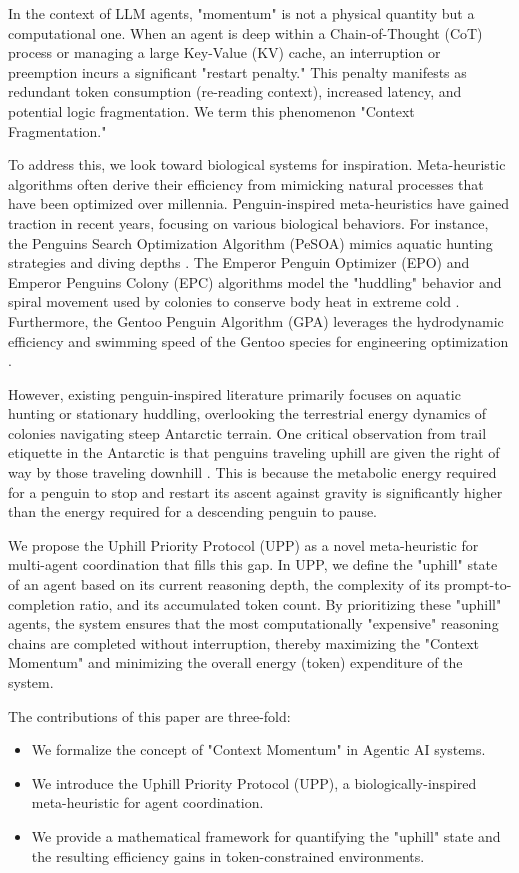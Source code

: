 \documentclass[conference]{IEEEtran}
\begin{document}
In the context of LLM agents, "momentum" is not a physical quantity but a computational one. When an agent is deep within a Chain-of-Thought (CoT) process or managing a large Key-Value (KV) cache, an interruption or preemption incurs a significant "restart penalty." This penalty manifests as redundant token consumption (re-reading context), increased latency, and potential logic fragmentation. We term this phenomenon "Context Fragmentation."

To address this, we look toward biological systems for inspiration. Meta-heuristic algorithms often derive their efficiency from mimicking natural processes that have been optimized over millennia. Penguin-inspired meta-heuristics have gained traction in recent years, focusing on various biological behaviors. For instance, the Penguins Search Optimization Algorithm (PeSOA) mimics aquatic hunting strategies and diving depths \cite{gheraibia2013pesoa}. The Emperor Penguin Optimizer (EPO) and Emperor Penguins Colony (EPC) algorithms model the "huddling" behavior and spiral movement used by colonies to conserve body heat in extreme cold \cite{dhiman2018epo, harifi2019epc}. Furthermore, the Gentoo Penguin Algorithm (GPA) leverages the hydrodynamic efficiency and swimming speed of the Gentoo species for engineering optimization \cite{palappan2020gpa}.

However, existing penguin-inspired literature primarily focuses on aquatic hunting or stationary huddling, overlooking the terrestrial energy dynamics of colonies navigating steep Antarctic terrain. One critical observation from trail etiquette in the Antarctic is that penguins traveling uphill are given the right of way by those traveling downhill \cite{sharpe2026penguin}. This is because the metabolic energy required for a penguin to stop and restart its ascent against gravity is significantly higher than the energy required for a descending penguin to pause.

We propose the Uphill Priority Protocol (UPP) as a novel meta-heuristic for multi-agent coordination that fills this gap. In UPP, we define the "uphill" state of an agent based on its current reasoning depth, the complexity of its prompt-to-completion ratio, and its accumulated token count. By prioritizing these "uphill" agents, the system ensures that the most computationally "expensive" reasoning chains are completed without interruption, thereby maximizing the "Context Momentum" and minimizing the overall energy (token) expenditure of the system.

The contributions of this paper are three-fold:
\begin{itemize}
    \item We formalize the concept of "Context Momentum" in Agentic AI systems.
    \item We introduce the Uphill Priority Protocol (UPP), a biologically-inspired meta-heuristic for agent coordination.
    \item We provide a mathematical framework for quantifying the "uphill" state and the resulting efficiency gains in token-constrained environments.
\end{itemize}
\end{document}
